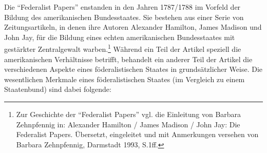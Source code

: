 \documentclass[a4paper,12pt]{article}
\begin{document}
Die "`Federalist Papers"' enstanden in den Jahren 1787/1788 im
Vorfeld der Bildung des amerikanischen Bundesstaates. Sie bestehen
aus einer Serie von Zeitungsartikeln, in denen ihre Autoren
Alexander Hamilton, James Madison und John Jay, für die Bildung
eines echten amerikanischen Bundesstaates mit gestärkter
Zentralgewalt warben.\footnote{Zur Geschichte der "`Federalist
Papers"' vgl. die Einleitung von Barbara Zehnpfennig in: Alexander
Hamilton / James Madison / John Jay\cite{hamilton}: Die Federalist
Papers. Übersetzt, eingeleitet und mit Anmerkungen versehen von
Barbara Zehnpfennig, Darmstadt 1993, S.1ff.} Während ein Teil der
Artikel speziell die amerikanischen Verhältnisse betrifft,
behandelt ein anderer Teil der Artikel die verschiedenen Aspekte
eines föderalistischen Staates in grundsätzlicher Weise. Die
wesentlichen Merkmale eines föderalistischen Staates (im Vergleich
zu einem Staatenbund) sind dabei folgende:
\end{document}
